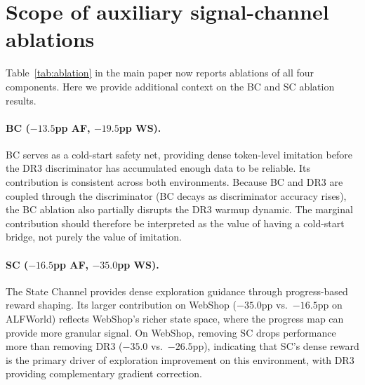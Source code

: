 %

\section{Scope of auxiliary signal-channel ablations}
\label{app:bc_sc_ablations}

Table~\ref{tab:ablation} in the main paper now reports ablations of all four components. Here we provide additional context on the BC and SC ablation results.

\paragraph{BC ($-13.5$pp AF, $-19.5$pp WS).} BC serves as a cold-start safety net, providing dense token-level imitation before the DR3 discriminator has accumulated enough data to be reliable. Its contribution is consistent across both environments. Because BC and DR3 are coupled through the discriminator (BC decays as discriminator accuracy rises), the BC ablation also partially disrupts the DR3 warmup dynamic. The marginal contribution should therefore be interpreted as the value of having a cold-start bridge, not purely the value of imitation.

\paragraph{SC ($-16.5$pp AF, $-35.0$pp WS).} The State Channel provides dense exploration guidance through progress-based reward shaping. Its larger contribution on WebShop ($-35.0$pp vs.\ $-16.5$pp on ALFWorld) reflects WebShop's richer state space, where the progress map can provide more granular signal. On WebShop, removing SC drops performance more than removing DR3 ($-35.0$ vs.\ $-26.5$pp), indicating that SC's dense reward is the primary driver of exploration improvement on this environment, with DR3 providing complementary gradient correction.
